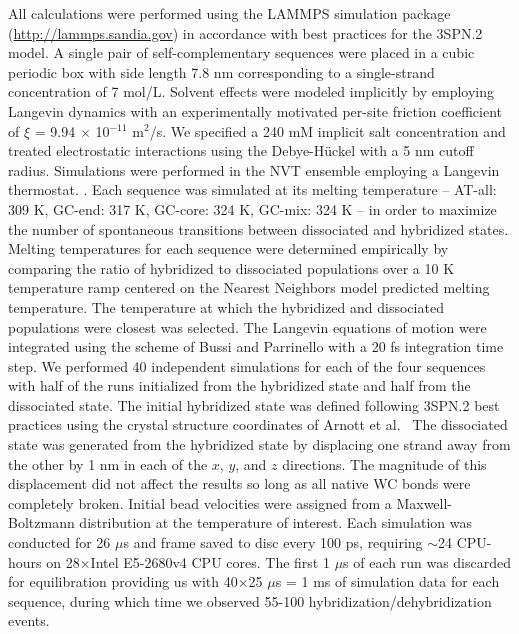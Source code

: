 \documentclass[journal=jpcbfk,manuscript=article]{achemso}
\begin{document}
All calculations were performed using the LAMMPS simulation package (\url{http://lammps.sandia.gov}) in accordance with best practices for the 3SPN.2 model. \citep{Plimpton1997Short-RangeDynamics} A single pair of self-complementary sequences were placed in a cubic periodic box with side length 7.8 nm corresponding to a single-strand concentration of 7 mol/L. Solvent effects were modeled implicitly by employing Langevin dynamics \citep{DunwegB.Paul1991BrownianNumbers., Bussi2007AccurateDynamics} with an experimentally motivated per-site friction coefficient of $\xi$ = 9.94 $\times$ 10$^{-11}$ m$^2$/s. \citep{Nkodo2001DiffusionElectrophoresis, Hinckley2013AnHybridization} We specified a 240 mM implicit salt concentration and treated electrostatic interactions using the Debye-H{\"u}ckel with a 5 nm cutoff radius. \citep{Debye1923ZurElektrolyte} Simulations were performed in the NVT ensemble employing a Langevin thermostat. \citep{Schneider1978Molecular-dynamicsTransitions}. Each sequence was simulated at its melting temperature -- AT-all: 309 K, GC-end: 317 K, GC-core: 324 K, GC-mix: 324 K -- in order to maximize the number of spontaneous transitions between dissociated and hybridized states. Melting temperatures for each sequence were determined empirically by comparing the ratio of hybridized to dissociated populations over a 10 K temperature ramp centered on the Nearest Neighbors model predicted melting temperature. The temperature at which the hybridized and dissociated populations were closest was selected. The Langevin equations of motion were integrated using the scheme of Bussi and Parrinello \citep{Bussi2007AccurateDynamics} with a 20 fs integration time step. We performed 40 independent simulations for each of the four sequences with half of the runs initialized from the hybridized state and half from the dissociated state. The initial hybridized state was defined following 3SPN.2 best practices using the crystal structure coordinates of Arnott et al.~\citep{Arnott1976CRCBiology} The dissociated state was generated from the hybridized state by displacing one strand away from the other by 1 nm in each of the $x$, $y$, and $z$ directions. The magnitude of this displacement did not affect the results so long as all native WC bonds were completely broken. Initial bead velocities were assigned from a Maxwell-Boltzmann distribution at the temperature of interest. Each simulation was conducted for 26 $\mu$s and frame saved to disc every 100 ps, requiring $\sim$24 CPU-hours on 28$\times$Intel E5-2680v4 CPU cores. The first 1 $\mu$s of each run was discarded for equilibration providing us with 40$\times$25 $\mu$s = 1 ms of simulation data for each sequence, during which time we observed 55-100 hybridization/dehybridization events.
\end{document}
